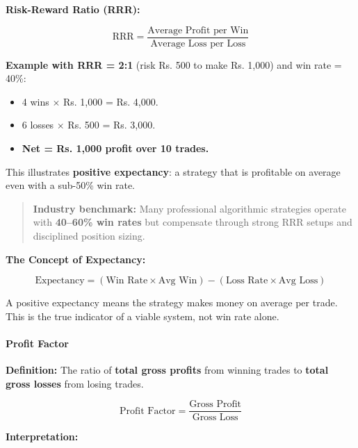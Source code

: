 \documentclass[12pt,openany]{book}
\begin{document}
\textbf{Risk-Reward Ratio (RRR):}

\begin{equation*}
    \text{RRR} = \frac{\text{Average Profit per Win}}{\text{Average Loss per Loss}}
\end{equation*}

\textbf{Example with RRR = 2:1} (risk Rs. 500 to make Rs. 1,000) and win rate = 40\%:
\begin{itemize}[leftmargin=*]
    \item 4 wins $\times$ Rs. 1,000 = Rs. 4,000.
    \item 6 losses $\times$ Rs. 500 = Rs. 3,000.
    \item \textbf{Net = Rs. 1,000 profit over 10 trades.}
\end{itemize}

This illustrates \textbf{positive expectancy}: a strategy that is profitable on average even with a sub-50\% win rate.

\begin{quote}
    \textbf{Industry benchmark:} Many professional algorithmic strategies operate with \textbf{40--60\% win rates} but compensate through strong RRR setups and disciplined position sizing.
\end{quote}

\textbf{The Concept of Expectancy:}

\begin{equation*}
    \text{Expectancy} = (\text{Win Rate} \times \text{Avg Win}) - (\text{Loss Rate} \times \text{Avg Loss})
\end{equation*}

A positive expectancy means the strategy makes money on average per trade. This is the true indicator of a viable system, not win rate alone.

\paragraph{Profit Factor}

\textbf{Definition:} The ratio of \textbf{total gross profits} from winning trades to \textbf{total gross losses} from losing trades.

\begin{equation*}
    \text{Profit Factor} = \frac{\text{Gross Profit}}{\text{Gross Loss}}
\end{equation*}

\textbf{Interpretation:}
\end{document}
